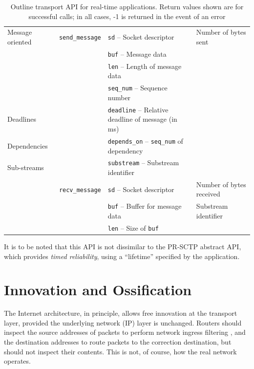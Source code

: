 \documentclass[10pt]{sig-alternate-05-2015}
\newcommand{\todo}[1]{\textbf{\textcolor{red}{To do -- #1}}}
\begin{document}
\begin{table}
\begin{tabularx}{\textwidth}{llll}
    \midrule
      Message oriented             & \texttt{send\_message}
                                              & \texttt{sd} -- Socket descriptor               & Number of bytes sent \\
                                   &          & \texttt{buf} -- Message data & \\
                                   &          & \texttt{len} -- Length of message data & \\
                                   &          & \texttt{seq\_num} -- Sequence number & \\
      Deadlines                    &          & \texttt{deadline} -- Relative deadline of message (in ms) & \\
      Dependencies                 &          & \texttt{depends\_on} -- \texttt{seq\_num} of dependency & \\
      Sub-streams                  &          & \texttt{substream} -- Substream identifier & \\
                                   & \texttt{recv\_message}
                                              & \texttt{sd} -- Socket descriptor               & Number of bytes received \\
                                   &          & \texttt{buf} -- Buffer for message data        & Substream identifier \\
                                   &          & \texttt{len} -- Size of \texttt{buf} & \\
    \bottomrule
  \end{tabularx}
  \caption{Outline transport API for real-time applications. Return values
  shown are for successful calls; in all cases, -1 is returned in the event
  of an error}
  \label{tab:api}
\end{table}

It is to be noted that this API is not dissimilar to the PR-SCTP abstract
API, which provides \textit{timed reliability}, using a ``lifetime''
specified by the application.

\section{Innovation and Ossification}
\label{sec:ossification}

The Internet architecture, in principle, allows free innovation at the
transport layer, provided the underlying network (IP) layer is unchanged.
Routers should inspect the source addresses of packets to perform network
ingress filtering \cite{rfc:2827}, and the destination addresses to route
packets to the correction destination, but should not inspect their
contents. This is not, of course, how the real network operates.
\end{document}
